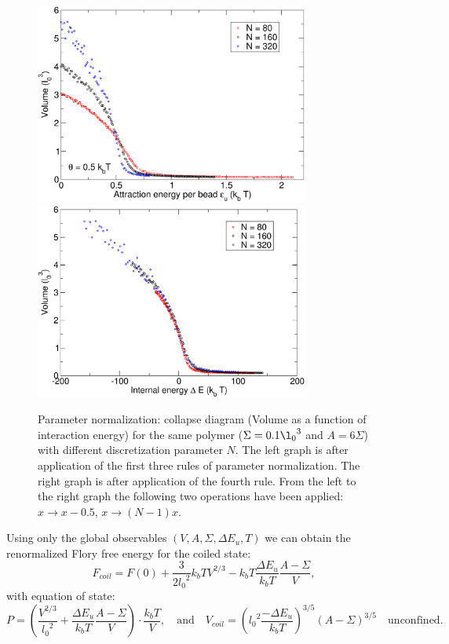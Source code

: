 \documentclass[12pt,a4paper,notitlepage]{article}
\begin{document}
\begin{figure}[h!]
\centering
\includegraphics[width=9cm]{reno_before}\includegraphics[width=9cm]{reno_after}\\
\caption{Parameter normalization:
  collapse diagram (Volume as a function of interaction energy) for the
  same polymer ($\Sigma = 0.1 {\l_0}^3$ and $A = 6 \Sigma$) with
  different discretization parameter $N$. The left graph is
  after application of the first three rules of parameter
  normalization. The right graph is after application of the fourth
  rule. From the left to the right graph the following two operations
  have been applied: $x \to x - 0.5$, $x \to (N - 1)x$.}
\label{fig:renor}
\end{figure}

Using only the global observables $(V, A, \Sigma, \Delta E_u, T)$ we can
obtain the renormalized Flory free energy for the coiled state:
\begin{equation}
  F_{coil} =   F(0) + \frac{3}{2 {l_0}^2} k_bT V^{2/3}
  - k_b T \frac{\Delta E_u}{k_b T} \frac{A - \Sigma}{V},
\label{eq:coilen}
\end{equation}
with equation of state:
\begin{equation}
  P = \left( \frac{V^{2/3}}{{l_0}^2} + \frac{\Delta
      E_u}{k_b T} \frac{A - \Sigma}{V}
      \right) \cdot \frac{k_b T}{V}, \quad
    \mathrm{and} \quad
  V_{coil} = \left( {l_0}^2 
    \frac{- \Delta E_u}{k_b T} \right)^{3/5}
  \left( A - \Sigma  \right) ^{3/5} \quad \mathrm{unconfined.}
\end{equation}
\end{document}
